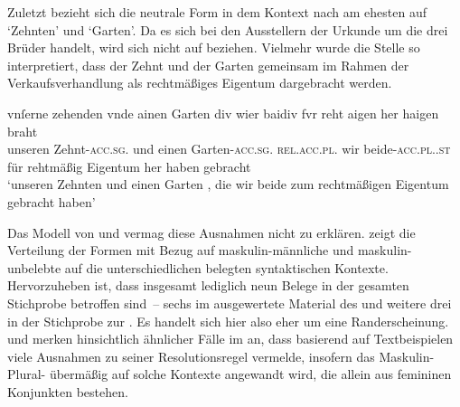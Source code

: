 
Zuletzt bezieht sich die neutrale Form  in 
dem Kontext nach am ehesten auf  `Zehnten' und 
`Garten'. Da es sich bei den Ausstellern der Urkunde um die drei Brüder
\autocites(Nrn.~1201~AB)[472,6--7]{cao2} handelt, wird sich  nicht
auf  beziehen. Vielmehr wurde die Stelle so interpretiert, dass der
Zehnt und der Garten gemeinsam im Rahmen der Verkaufsverhandlung als
rechtmäßiges Eigentum dargebracht werden.

\begin{exe}
\ex \label{ex:m+m_beidiu_5}
	\gll vnſerne zehenden \textelp{} vnde ainen Garten \textelp{} div wier
			baidiv fvr reht aigen her haigen braht \\
		unseren Zehnt-\textsc{acc.sg.\MascI} {} und einen
		Garten-\textsc{acc.sg.\MascI} {} \textsc{rel.acc.pl.\NeutI} wir
		beide-\textsc{acc.pl.\NeutI.st} für rehtmäßig Eigentum her haben
		gebracht \\
	\trans `unseren Zehnten \textelp{} und einen Garten \textelp{}, die wir
		beide zum rechtmäßigen Eigentum gebracht haben'
		\parencites(Nrn.~1201~AB, Kl.~Heiligkreuztal, Kr.~Biberach, 1290)[472,10--14]{cao2}
\end{exe}

Das Modell von \citet{wechsler2009} und \citet{wechslerzlatic2003} vermag diese
Ausnahmen nicht zu erklären.  zeigt die
Verteilung der Formen mit Bezug auf maskulin-männliche und maskulin-unbelebte
 auf die unterschiedlichen belegten syntaktischen Kontexte.
Hervorzuheben ist, dass insgesamt lediglich neun Belege in der gesamten
Stichprobe betroffen sind~-- sechs im ausgewertete Material des \CAO{} und
weitere drei in der Stichprobe zur \KC{}. Es handelt sich hier also eher um
eine Randerscheinung. \citet[581]{wechsler2009} und
\citet[190]{wechslerzlatic2003} merken hinsichtlich ähnlicher Fälle im
 an, dass \citet{corbett1983,corbett1991} basierend auf
Textbeispielen viele Ausnahmen zu seiner Resolutionsregel
vermelde, insofern das Maskulin-Plural- übermäßig auf solche
Kontexte angewandt wird, die allein aus femininen Konjunkten bestehen.

